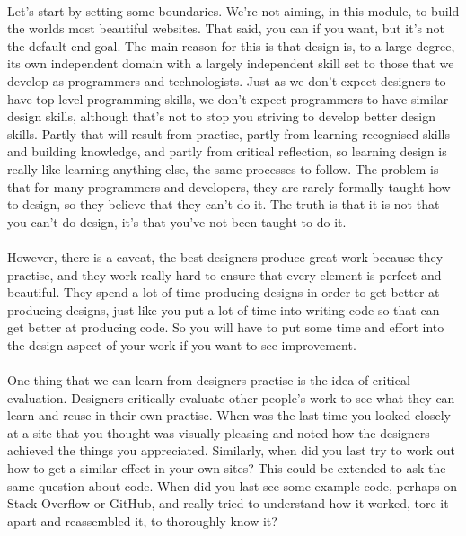 \paragraph{} Let's start by setting some boundaries. We're not aiming, in this module, to build the worlds most beautiful websites. That said, you can if you want, but it's not the default end goal. The main reason for this is that design is, to a large degree, its own independent domain with a largely independent skill set to those that we develop as programmers and technologists. Just as we don't expect designers to have top-level programming skills, we don't expect programmers to have similar design skills, although that's not to stop you striving to develop better design skills. Partly that will result from practise, partly from learning recognised skills and building knowledge, and partly from critical reflection, so learning design is really like learning anything else, the same processes to follow. The problem is that for many programmers and developers, they are rarely formally taught how to design, so they believe that they can't do it. The truth is that it is not that you can't do design, it's that you've not been taught to do it.
\paragraph{} However, there is a caveat, the best designers produce great work because they practise, and they work really hard to ensure that every element is perfect and beautiful. They spend a lot of time producing designs in order to get better at producing designs, just like you put a lot of time into writing code so that can get better at producing code. So you will have to put some time and effort into the design aspect of your work if you want to see improvement.
\paragraph{} One thing that we can learn from designers practise is the idea of critical evaluation. Designers critically evaluate other people’s work to see what they can learn and reuse in their own practise. When was the last time you looked closely at a site that you thought was visually pleasing and noted how the designers achieved the things you appreciated. Similarly, when did you last try to work out how to get a similar effect in your own sites? This could be extended to ask the same question about code. When did you last see some example code, perhaps on Stack Overflow or GitHub, and really tried to understand how it worked, tore it apart and reassembled it, to thoroughly know it?
